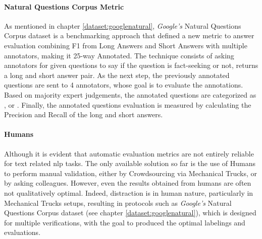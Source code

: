\paragraph{Natural Questions Corpus Metric}
As mentioned in chapter \ref{dataset:googlenatural}, \textit{Google's} Natural Questions Corpus dataset \autocite{paper:google-natural-questions} is a benchmarking approach that defined a new metric to answer evaluation combining F1 from Long Answers and Short Answers with multiple annotators, making it 25-way Annotated. The technique consists of asking annotators for given questions to say if the question is fact-seeking or not, returns a long and short answer pair. As the next step, the previously annotated questions are sent to 4 annotators, whose goal is to evaluate the annotations. Based on majority expert judgements, the annotated questions are categorized as ,  or . Finally, the annotated questions evaluation is measured by calculating the Precision and Recall of the long and short answers.

\paragraph{Humans}
Although it is evident that automatic evaluation metrics are not entirely reliable for text related \gls{nlp} tasks. The only available solution so far is the use of Humans to perform manual validation, either by Crowdsourcing via Mechanical Trucks, or by asking colleagues. However, even the results obtained from humans are often not qualitatively optimal. Indeed, distraction is in human nature, particularly in Mechanical Trucks setups, resulting in protocols such as \textit{Google's} Natural Questions Corpus dataset (see chapter \ref{dataset:googlenatural}), which is designed for multiple verifications, with the goal to produced the optimal labelings and evaluations.

